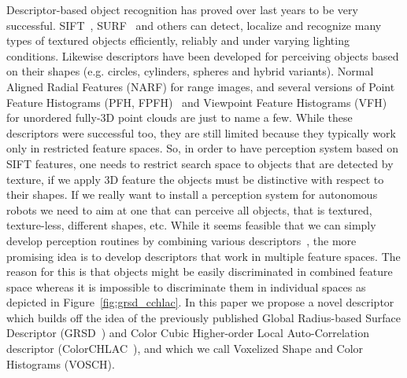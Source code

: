 \documentclass[conference]{sty/IEEEtran}
\begin{document}
Descriptor-based object recognition has proved over last years to be very successful.
SIFT~\cite{lowe04distinctive}, SURF~\cite{surf} and others can
detect, localize and recognize many types of textured objects efficiently, reliably
and under varying lighting conditions. Likewise descriptors have been developed 
for perceiving objects based on their shapes (e.g. circles, cylinders, spheres and hybrid variants).
Normal Aligned Radial Features (NARF)\cite{steder10irosws} for range images, 
and several versions of Point Feature  Histograms (PFH, FPFH)~\cite{Rusu09ICRA} and 
Viewpoint Feature Histograms (VFH)~\cite{vfh} for unordered fully-3D point clouds are just 
to name a few. While these descriptors were successful too, they are still limited because they
typically work only in restricted feature spaces. So, in order to have perception system
based on SIFT features, one needs to restrict search space to objects that are detected by
texture, if we apply 3D feature the objects must be distinctive with respect to their shapes. 
If we really want to install a perception system for autonomous robots we need to aim 
at one that can perceive all objects, that is textured, texture-less, different shapes, etc.
While it seems feasible that we can simply develop perception routines by combining
various descriptors~\cite{stueckler10combining, GRSD10Humanoids}, the more promising idea 
is to develop descriptors that work in multiple feature spaces. The reason for this is 
that objects might be easily discriminated in combined feature space whereas it is impossible 
to discriminate them in individual spaces as depicted in Figure~\ref{fig:grsd_cchlac}.
In this paper we propose a novel descriptor which builds off the idea of the previously 
published Global Radius-based Surface Descriptor (GRSD~\cite{GRSD10Humanoids}) and 
Color Cubic Higher-order Local Auto-Correlation descriptor (ColorCHLAC~\cite{kanezaki2010tvc}), 
and which we call Voxelized Shape and Color Histograms (VOSCH).
\end{document}
